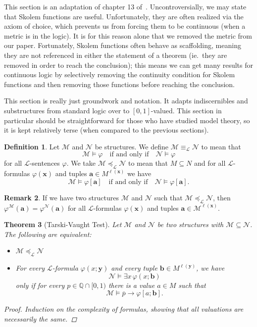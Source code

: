 \documentclass{amsart}
\newtheorem{theorem}{Theorem}[section]
\theoremstyle{definition}
\newtheorem{remark}[theorem]{Remark}
\newtheorem{definition}[theorem]{Definition}
\numberwithin{equation}{theorem}
\renewcommand{\phi}{\varphi}
\newcommand{\Q}{\mathbb{Q}}
\newcommand{\V}{\mathbf}
\newcommand{\rat}[1]{{\overline{#1}}}
\newcommand{\narrow}[1]{\xrightarrow{#1}}
\renewcommand{\to}{\narrow{}}
\newcommand{\len}{\ell}
\newcommand{\frag}{\mathcal{L}}
\begin{document}
This section is an adaptation of chapter 13 of~\cite{keisler1971model}.
Uncontroversially, we may state that Skolem functions are useful.
Unfortunately, they are often realized via the axiom of choice, which prevents us from forcing them to be continuous (when a metric is in the logic).
It is for this reason alone that we removed the metric from our paper.
Fortunately, Skolem functions often behave as scaffolding, meaning they are not referenced in either the statement of a theorem (ie.\ they are removed in order to reach the conclusion); this means we can get many results for continuous logic by selectively removing the continuity condition for Skolem functions and then removing those functions before reaching the conclusion.

This section is really just groundwork and notation.
It adapts indiscernibles and substructures from standard logic over to $[0,1]$-valued.
This section in particular should be straightforward for those who have studied model theory, so it is kept relatively terse (when compared to the previous sections).

\begin{definition}
  Let $\mathcal M$ and $\mathcal N$ be structures.
  We define $\mathcal M\equiv_\frag\mathcal N$ to mean that
  \[
    \mathcal M\models\phi \quad\text{if and only if}\quad \mathcal N\models\phi
  \]
  for all $\frag$-sentences $\phi$.
  We take $\mathcal M\preceq_\mathcal L\mathcal N$ to mean that $M\subseteq N$ and for all $\mathcal L$-formulas $\phi(\V x)$ and tuples $\V a\in M^{\len(\V x)}$ we have
  \[
    \mathcal M\models\phi[\V a]\quad\text{if and only if}\quad\mathcal N\models\phi[\V a].
  \]
\end{definition}

\begin{remark}
  If we have two structures $\mathcal M$ and $\mathcal N$ such that $\mathcal M\preceq_\frag\mathcal N$, then $\phi^\mathcal M(\V a)=\phi^\mathcal N(\V a)$ for all $\frag$-formulas $\phi(\V x)$ and tuples $\V a\in\mathcal M^{\len(\V x)}$.
\end{remark}

\begin{theorem}[Tarski-Vaught Test]\label{lem:tarski-vaught-test}
  Let $\mathcal M$ and $\mathcal N$ be two structures with $\mathcal M\subseteq\mathcal N$.
  The following are equivalent:
  \begin{itemize}
  \item $\mathcal M\preceq_\frag\mathcal N$
  \item 
     For every $\mathcal L$-formula $\phi(x;\V y)$ and every tuple $\V b\in M^{\len(\V y)}$, we have
     \[
       \mathcal N\models\exists x\,\phi(x;\V b)
     \]
     only if for every $p\in\Q\cap[0,1)$ there is a value $a\in M$ such that
     \[
       \mathcal M\models\rat p\to\phi[a;\V b].
     \]
  \end{itemize}
  \begin{proof}
    Induction on the complexity of formulas, showing that all valuations are necessarily the same.
  \end{proof}
\end{theorem}
\end{document}
